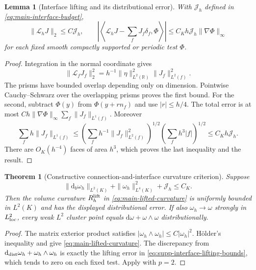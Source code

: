 \documentclass[11pt]{article}
\newtheorem{theorem}{Theorem}[section]
\numberwithin{equation}{section}
\newtheorem{lemma}[lemma]{Lemma}
\theoremstyle{definition}
\theoremstyle{remark}
\newcommand{\R}{\mathbb R}
\newcommand{\dd}{\mathrm d}
\begin{document}
\begin{lemma}[Interface lifting and its distributional error]
\label{lem:supp-interface-lifting}
With $\mathcal J_h$ defined in \eqref{eq:main-interface-budget},
\begin{equation}
 \|\mathcal L_hJ\|_2\le C\mathcal J_h,\qquad
 \left|\left\langle\mathcal L_hJ-\sum_fJ_f\delta_f,\Phi\right\rangle\right|
       \le C_Kh\mathcal J_h\|\nabla\Phi\|_\infty
 \label{eq:supp-interface-lifting-bounds}
\end{equation}
for each fixed smooth compactly supported or periodic test $\Phi$.
\end{lemma}
\begin{proof}
Integration in the normal coordinate gives
\[
 \|\mathcal L_fJ_f\|_2^2
       =h^{-1}\|\eta\|_{L^2(\R)}^2\|J_f\|_{L^2(f)}^2.
\]
The prisms have bounded overlap depending only on dimension.  Pointwise
Cauchy--Schwarz over the overlapping prisms proves the first bound.
For the second, subtract $\Phi(y)$ from $\Phi(y+rn_f)$ and use
$|r|\le h/4$.  The total error is at most
$Ch\|\nabla\Phi\|_\infty\sum_f\|J_f\|_{L^1(f)}$.  Moreover
\[
 \sum_fh\|J_f\|_{L^1(f)}
 \le\left(\sum_fh^{-1}\|J_f\|_{L^2(f)}^2\right)^{1/2}
       \left(\sum_fh^3|f|\right)^{1/2}
 \le C_Kh\mathcal J_h.
\]
There are $O_K(h^{-4})$ faces of area $h^3$, which proves the last
inequality and the result.
\end{proof}

\begin{theorem}[Constructive connection-and-interface curvature criterion]
\label{thm:supp-interface-curvature}
Suppose
\begin{equation}
 \|\dd_b\omega_h\|_{L^2(K)}+\|\omega_h\|_{L^4(K)}^2+
       \mathcal J_h\le C_K.
 \label{eq:supp-connection-interface-budget}
\end{equation}
Then the volume curvature $R_h^{\rm lift}$ in
\eqref{eq:main-lifted-curvature} is uniformly bounded in $L^2(K)$ and has
the displayed distributional error.  If also
$\omega_h\to\omega$ strongly in $L^2_{\rm loc}$, every weak $L^2$ cluster
point equals $\dd\omega+\omega\wedge\omega$ distributionally.
\end{theorem}
\begin{proof}
The matrix exterior product satisfies
$|\omega_h\wedge\omega_h|\le C|\omega_h|^2$.  H\"older's inequality and
 give
\eqref{eq:main-lifted-curvature}.  The discrepancy from
$\dd_{\rm dist}\omega_h+\omega_h\wedge\omega_h$ is exactly the lifting
error in \eqref{eq:supp-interface-lifting-bounds}, which tends to zero on
each fixed test.  Apply  with $p=2$.
\end{proof}
\end{document}

